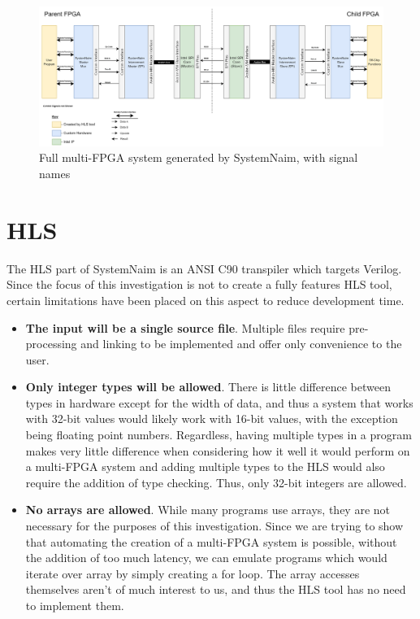 \begin{figure}
    \centering
    \includegraphics[width=\textwidth]{04_Implementation/images/FGPA_Interface_block_diagram.png}
    \caption{Full multi-FPGA system generated by SystemNaim, with signal names}
    \label{fig:indepth_full_sys}
\end{figure}


\section{HLS}

The HLS part of SystemNaim is an ANSI C90 transpiler which targets Verilog. Since the focus of this investigation is not to create a fully features HLS tool, certain limitations have been placed on this aspect to reduce development time.

\begin{itemize}
    \item \textbf{The input will be a single source file}. Multiple files require pre-processing and linking to be implemented and offer only convenience to the user.
    \item \textbf{Only integer types will be allowed}. There is little difference between types in hardware except for the width of data, and thus a system that works with 32-bit values would likely work with 16-bit values, with the exception being floating point numbers. Regardless, having multiple types in a program makes very little difference when considering how it well it would perform on a multi-FPGA system and adding multiple types to the HLS would also require the addition of type checking. Thus, only 32-bit integers are allowed.
    \item \textbf{No arrays are allowed}. While many programs use arrays, they are not necessary for the purposes of this investigation. Since we are trying to show that automating the creation of a multi-FPGA system is possible, without the addition of too much latency, we can emulate programs which would iterate over array by simply creating a for loop. The array accesses themselves aren't of much interest to us, and thus the HLS tool has no need to implement them.
\end{itemize}

